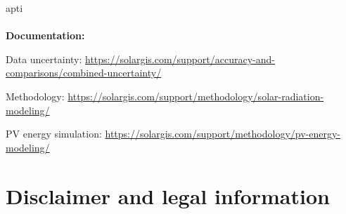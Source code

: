 apti     \documentclass[10pt,a4paper,UTF8]{article}
\begin{document}
{{\begin{longtabu}
     \end{longtabu} 
     }  %

\paragraph{}\textbf{Documentation:}\begin{description}[noitemsep]
\item Data uncertainty: \url{https://solargis.com/support/accuracy-and-comparisons/combined-uncertainty/}\item Methodology: \url{https://solargis.com/support/methodology/solar-radiation-modeling/}\item PV energy simulation: \url{https://solargis.com/support/methodology/pv-energy-modeling/}
\end{description}\newpage{}
\section{ Disclaimer and legal information }
\setcounter{figure}{0}
\setcounter{table}{0}

}
\end{document}
